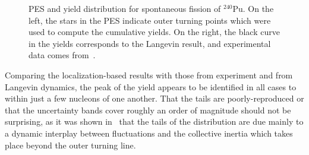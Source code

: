 \begin{figure}%
	\centering
	\qquad
	\caption{PES and yield distribution for spontaneous fission of $^{240}$Pu. On the left, the stars in the PES indicate outer turning points which were used to compute the cumulative yields. On the right, the black curve in the yields corresponds to the Langevin result, and experimental data comes from~\cite{Laidler1962, Thierens1981}.}%
	\label{fig:240Pu-yield}%
\end{figure}

Comparing the localization-based results with those from experiment and from Langevin dynamics, the peak of the yield appears to be identified in all cases to within just a few nucleons of one another. That the tails are poorly-reproduced or that the uncertainty bands cover roughly an order of magnitude should not be surprising, as it was shown in~\cite{Sadhukhan2016, Sadhukhan2017} that the tails of the distribution are due mainly to a dynamic interplay between fluctuations and the collective inertia which takes place beyond the outer turning line.

